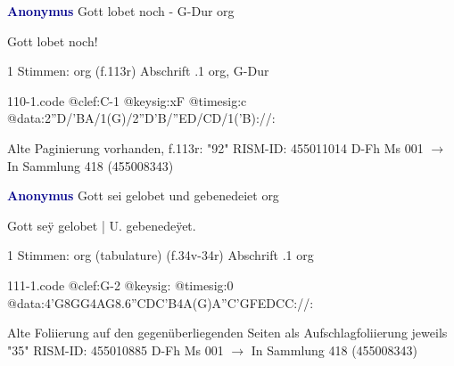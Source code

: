 \documentclass[twocolumn]{book}
\begin{document}
\newline \par \vspace{7pt} \textcolor{darkblue}{\textbf{Anonymus  }}
\newline Gott lobet noch - G-Dur
\newline org
\newline \begin{itshape}[f.113r, heading:] Gott lobet noch!\end{itshape} 
\newline \textcolor{darkblue}{}  1 Stimmen: org  (f.113r)
\newline Abschrift
.1  org, G-Dur  
\begin{filecontents*}{110-1.code}
@clef:C-1
@keysig:xF
@timesig:c
@data:2''D/'BA/1(G)/2''D'B/''ED/CD/1('B)://:
\end{filecontents*}
\newline
%
\newline Alte Paginierung vorhanden, f.113r: "92"
\newline RISM-ID: 455011014
\newline D-Fh  Ms 001
\newline $\rightarrow$ In Sammlung 418 (455008343)
      
\newline \par \vspace{7pt} \textcolor{darkblue}{\textbf{Anonymus  }}
\newline Gott sei gelobet und gebenedeiet
\newline org
\newline \begin{itshape}[f.34v, at left:] Gott seÿ gelobet | U. gebenedeÿet.\end{itshape} 
\newline \textcolor{darkblue}{}  1 Stimmen: org (tabulature)  (f.34v-34r)
\newline Abschrift
.1  org  
\begin{filecontents*}{111-1.code}
@clef:G-2
@keysig:
@timesig:0
@data:4'G{8GG}4AG{8.6''CDC'B}4A(G)A''C'GFEDCC://:
\end{filecontents*}
\newline
%
\newline Alte Foliierung auf den gegenüberliegenden Seiten als Aufschlagfoliierung jeweils "35"
\newline RISM-ID: 455010885
\newline D-Fh  Ms 001
\newline $\rightarrow$ In Sammlung 418 (455008343)
      
\end{document}
